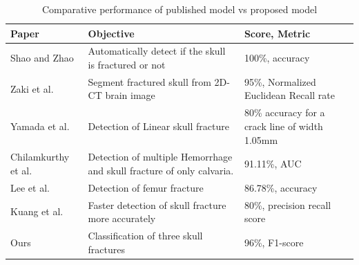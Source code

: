 \documentclass[sigconf]{acmart}
\begin{document}
\begin{table}
\begin{center}
\caption{Comparative performance of published model vs proposed model}

\setlength{\arrayrulewidth}{0.1mm}
 \setlength{\tabcolsep}{11pt}
\renewcommand{\arraystretch}{2.5}

\begin{tabular}{|p{1.3cm}|p{2.5cm}|p{2.2cm}|}
\hline
 Paper &Objective  &Score, Metric  \\
\hline
Shao and Zhao\cite{shao2003automatic}&Automatically detect if the skull is fractured or not  &100\%, accuracy  \\
\hline
Zaki et al.\cite{za20ki09new}&Segment fractured skull from 2D-CT brain image  &95\%, Normalized Euclidean Recall rate  \\
\hline

Yamada et al.\cite{yamada2016preliminary}&Detection of Linear skull fracture &80\% accuracy for a crack line of width 1.05mm  \\
\hline
Chilamkurthy et al. \cite{chilamkurthy2018deep}&Detection of multiple Hemorrhage and skull fracture of only calvaria. &91.11\%, AUC \\
\hline
Lee et al. \cite{lee2020classification}&Detection of femur fracture &86.78\%, accuracy  \\
\hline
Kuang et al. \cite{kuang2020skull}&Faster detection of skull fracture more accurately  &80\%, precision recall score  \\
\hline
Ours&Classification of three skull fractures &96\%, F1-score  \\



\hline

\end{tabular}

\end{center}

\label{tab:9}

\end{table}
\end{document}
